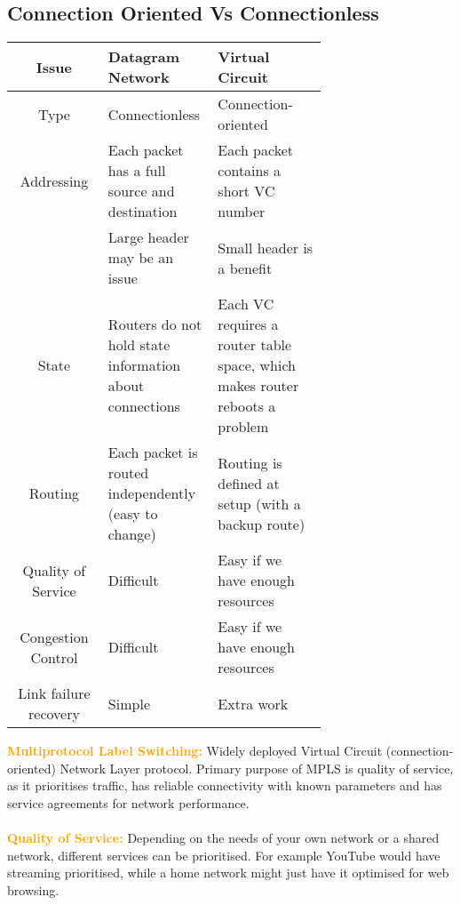 \documentclass[a4paper,10pt]{article}
\begin{document}
\subsection{Connection Oriented Vs Connectionless}
\begin{center}
	\begin{tabular}{|c|p{0.35\linewidth}|p{0.35\linewidth}|}
		\hline
		\textbf{Issue} &\textbf{Datagram Network} &\textbf{Virtual Circuit} \\
		\hline 
		Type &Connectionless &Connection-oriented \\
		\hline 
		Addressing &Each packet has a full source and destination &Each packet contains a short VC number \\
		 &Large header may be an issue &Small header is a benefit \\
		\hline
		State &Routers do not hold state information about connections &Each VC requires a router table space, which makes router reboots a problem \\
		\hline
		Routing &Each packet is routed independently (easy to change) &Routing is defined at setup (with a backup route) \\
		\hline 
		Quality of Service &Difficult &Easy if we have enough resources \\
		\hline 
		Congestion Control &Difficult &Easy if we have enough resources \\ 
		\hline 
		Link failure recovery &Simple &Extra work \\
		\hline
	\end{tabular}
\end{center}
\textcolor{Orange}{\textbf{Multiprotocol Label Switching:}} Widely deployed Virtual Circuit (connection-oriented) Network Layer protocol. Primary purpose of MPLS is quality of service, as it prioritises traffic, has reliable connectivity with known parameters and has service agreements for network performance. \\\\
\textcolor{Orange}{\textbf{Quality of Service:}} Depending on the needs of your own network or a shared network, different services can be prioritised. For example YouTube would have streaming prioritised, while a home network might just have it optimised for web browsing. 
\end{document}
